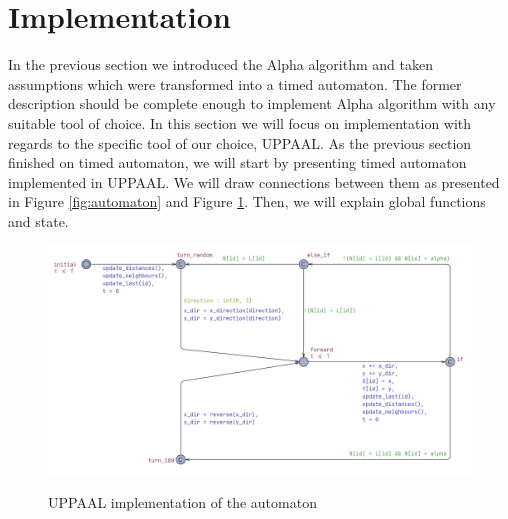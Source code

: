 \section{Implementation}
In the previous section we introduced the Alpha algorithm and taken assumptions which were transformed into a timed automaton. The former description should be complete enough to implement Alpha algorithm with any suitable tool of choice. In this section we will focus on implementation with regards to the specific tool of our choice, UPPAAL. As the previous section finished on timed automaton, we will start by presenting timed automaton implemented in UPPAAL. We will draw connections between them as presented in Figure \ref{fig:automaton} and Figure \ref{fig:automaton_uppaal}. Then, we will explain global functions and state.

\begin{figure}[H]
\caption{UPPAAL implementation of the automaton}
\includegraphics[scale=0.3]{images/automaton_uppaal.png}
\label{fig:automaton_uppaal}
\end{figure}

